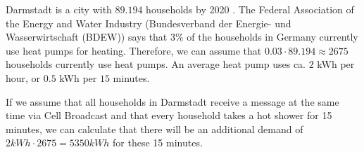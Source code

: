 Darmstadt is a city with $89.194$ households by 2020 
\cite{statistadarmstadt}. The 
Federal Association of the Energy and Water Industry
(Bundesverband der Energie- und Wasserwirtschaft (BDEW)) 
says that $3\%$ of the households in Germany currently use
heat pumps for heating. Therefore, we can assume that 
$0.03 \cdot 89.194 \approx 2675$ households currently use 
heat pumps. An average heat pump uses ca. $2$ kWh per hour, 
or $0.5$ kWh per $15$ minutes.

If we assume that all households in Darmstadt receive 
a message at the same time via Cell Broadcast and that
every household takes a hot shower for 15 minutes,
we can calculate that there will be an additional 
demand of $2kWh \cdot 2675 = 5350 kWh $ for these 
15 minutes.